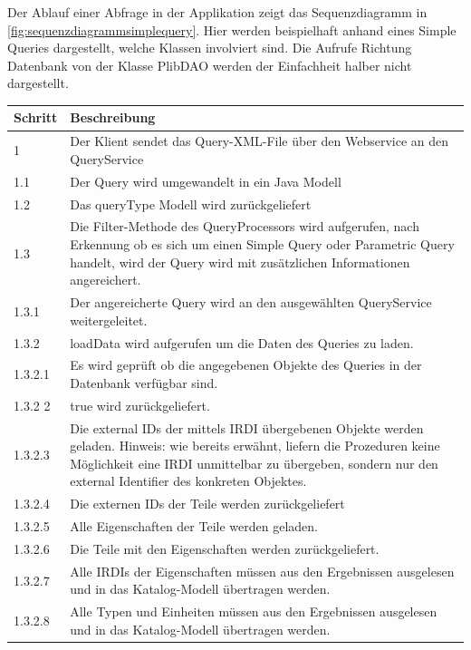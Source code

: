 Der Ablauf einer Abfrage in der Applikation zeigt das Sequenzdiagramm in \autoref{fig:sequenzdiagrammsimplequery}. Hier werden beispielhaft anhand eines Simple Queries dargestellt, welche Klassen involviert sind. Die Aufrufe Richtung Datenbank von der Klasse PlibDAO werden der Einfachheit halber nicht dargestellt. 

\begin{table}[!hbt]\vspace{1ex}\centering\begin{tabular}{p{3cm}p{10cm}}
\hline
Schritt & Beschreibung\\
\hline
\hline
1 &  Der Klient sendet das Query-XML-File über den Webservice an den QueryService \\
\hline
1.1 &  Der Query wird umgewandelt in ein Java Modell \\
\hline
1.2 &  Das queryType Modell wird zurückgeliefert \\
\hline
1.3 &  Die Filter-Methode des QueryProcessors wird aufgerufen, nach Erkennung ob es sich um einen Simple Query oder Parametric Query handelt, wird der Query wird mit zusätzlichen Informationen angereichert. \\
\hline
1.3.1 &  Der angereicherte Query wird an den ausgewählten QueryService weitergeleitet.  \\
\hline
1.3.2 &  loadData wird aufgerufen um die Daten des Queries zu laden. \\
\hline
1.3.2.1 &  Es wird geprüft ob die angegebenen Objekte des Queries in der Datenbank verfügbar sind. \\
\hline
1.3.2 2 &  true wird zurückgeliefert. \\
\hline
1.3.2.3 &  Die external IDs der mittels IRDI übergebenen Objekte werden geladen. Hinweis: wie bereits erwähnt, liefern die Prozeduren keine Möglichkeit eine IRDI unmittelbar zu übergeben, sondern nur den external Identifier des konkreten Objektes. \\
\hline
1.3.2.4 &  Die externen IDs der Teile werden zurückgeliefert \\
\hline
1.3.2.5 &  Alle Eigenschaften der Teile werden geladen.  \\
\hline
1.3.2.6 &  Die Teile mit den Eigenschaften werden zurückgeliefert. \\
\hline
1.3.2.7 &  Alle IRDIs der Eigenschaften müssen aus den Ergebnissen ausgelesen und in das Katalog-Modell übertragen werden. \\
\hline
1.3.2.8 &  Alle Typen und Einheiten müssen aus den Ergebnissen ausgelesen und in das Katalog-Modell übertragen werden. \\

\end{tabular}
\end{table}
